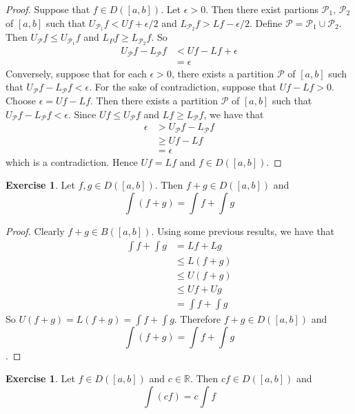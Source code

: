 \documentclass{book}
\theoremstyle{definition}
\newtheorem{ex}[definition]{Exercise}
\newcommand{\ep}{\epsilon}
\newcommand{\R}{\mathbb{R}}
\newcommand{\MP}{\mathcal{P}}
\newcommand{\lex}[1]{\label{ex:#1}}
\DeclareMathOperator*{\0}{\mbf{0}}
\DeclareMathOperator*{\1}{\mbf{1}}
\begin{document}
	\begin{proof}
		Suppose that $f \in D([a,b])$. Let $\ep >0$. Then there exist partions $\MP_1$, $\MP_2$ of $[a,b]$ such that $U_{\MP_1} f < Uf + \ep/2$ and $L_{\MP_2} f > Lf - \ep/2$. Define $\MP = \MP_1 \cup \MP_2$. Then $U_\MP f \leq U_{\MP_1} f$ and $L_P f \geq L_{\MP_2}f$. So  
		\begin{align*}
			U_\MP f - L_\MP f 
			&< Uf - L f + \ep \\
			&= \ep
		\end{align*}  
		Conversely, suppose that for each $\ep >0$, there exists a partition $\MP$ of $[a,b]$ such that $U_\MP f - L_\MP f < \ep$. For the sake of contradiction, suppose that $Uf - Lf > 0$. Choose $\ep = Uf - Lf$. Then there exists a partition $\MP$ of $[a,b]$ such that $U_\MP f - L_\MP f < \ep$. Since $Uf \leq U_\MP f$ and $Lf \geq L_\MP f$, we have that 
		\begin{align*}
			\ep 
			&> U_\MP f - L_\MP f \\
			&\geq Uf - Lf \\
			&= \ep
		\end{align*} 
		which is a contradiction. Hence $Uf = Lf$ and $f \in D([a,b])$.
	\end{proof}

	\begin{ex} \lex{00000} 
		Let $f, g \in D([a,b])$. Then $f+g \in D([a,b])$ and $$\int (f+g) = \int f + \int g$$
	\end{ex}
	
	\begin{proof}
		Clearly $f+g \in B([a,b])$. Using some previous results, we have that 
		\begin{align*}
			\int f + \int g 
			&= Lf + Lg \\
			&\leq L(f+g) \\
			&\leq U(f+g) \\
			&\leq Uf + Ug \\
			&= \int f + \int g
		\end{align*}
		So $U(f+g) = L(f+g) = \int f + \int g$. Therefore $f+g \in D([a,b])$ and $$\int (f+g) = \int f + \int g$$.
	\end{proof}

	\begin{ex} \lex{00000} 
		Let $f \in D([a,b])$ and $c \in \R$. Then $cf \in D([a,b])$ and $$\int (cf) = c \int f $$
	\end{ex}
\end{document}
